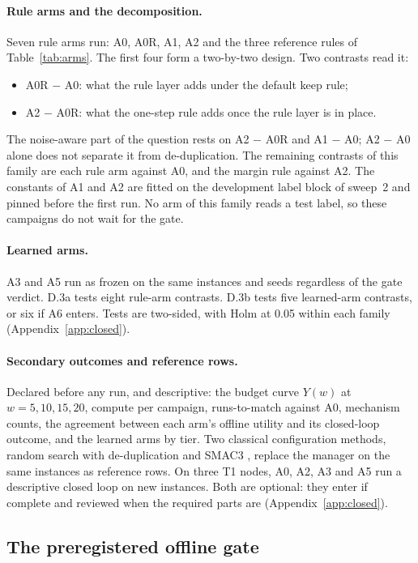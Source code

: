 \paragraph{Rule arms and the decomposition.}
Seven rule arms run: A0, A0R, A1, A2 and the three reference rules of Table~\ref{tab:arms}. The first four form a two-by-two design. Two contrasts read it:
\begin{itemize}
\item A0R $-$ A0: what the rule layer adds under the default keep rule;
\item A2 $-$ A0R: what the one-step rule adds once the rule layer is in place.
\end{itemize}
The noise-aware part of the question rests on A2 $-$ A0R and A1 $-$ A0; A2 $-$ A0 alone does not separate it from de-duplication. The remaining contrasts of this family are each rule arm against A0, and the margin rule against A2. The constants of A1 and A2 are fitted on the development label block of sweep~2 and pinned before the first run. No arm of this family reads a test label, so these campaigns do not wait for the gate.

\paragraph{Learned arms.}
A3 and A5 run as frozen on the same instances and seeds regardless of the gate verdict. D.3a tests eight rule-arm contrasts. D.3b tests five learned-arm contrasts, or six if A6 enters. Tests are two-sided, with Holm at 0.05 within each family (Appendix~\ref{app:closed}).

\paragraph{Secondary outcomes and reference rows.}
Declared before any run, and descriptive: the budget curve $Y(w)$ at $w=5,10,15,20$, compute per campaign, runs-to-match against A0, mechanism counts, the agreement between each arm's offline utility and its closed-loop outcome, and the learned arms by tier. Two classical configuration methods, random search with de-duplication and SMAC3 \citep{lindauer2022smac}, replace the manager on the same instances as reference rows. On three T1 nodes, A0, A2, A3 and A5 run a descriptive closed loop on new instances. Both are optional: they enter if complete and reviewed when the required parts are (Appendix~\ref{app:closed}).

\subsection{The preregistered offline gate}
\label{sec:setup-gate}

